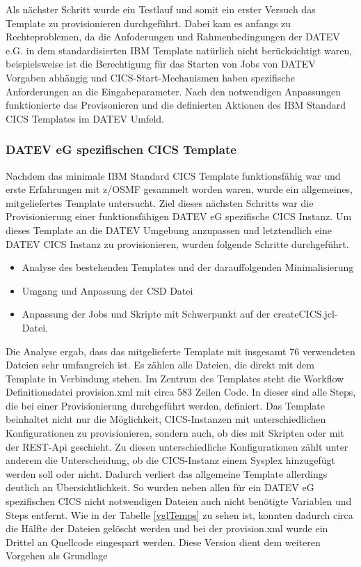 Als nächster Schritt wurde ein Testlauf und somit ein erster Versuch das Template zu provisionieren durchgeführt.
Dabei kam es anfangs zu Rechteproblemen, da die Anfoderungen und Rahmenbedingungen der DATEV e.G. in dem standardisierten IBM Template natürlich nicht berücksichtigt waren, beispielsweise ist die Berechtigung für das Starten von Jobs von DATEV Vorgaben abhängig und CICS-Start-Mechanismen haben spezifische Anforderungen an die Eingabeparameter.
Nach den notwendigen Anpassungen funktionierte das Provisonieren und die definierten Aktionen des IBM Standard CICS Templates im DATEV Umfeld.

\subsubsection{DATEV eG spezifischen CICS Template}\label{sssec:datevcics}
Nachdem das minimale IBM Standard CICS Template funktionsfähig war und erste Erfahrungen mit z/OSMF gesammelt worden waren, wurde ein allgemeines, mitgeliefertes Template untersucht.
Ziel dieses nächsten Schritts war die Provisionierung einer funktionsfähigen DATEV eG spezifische CICS Instanz.
Um dieses Template an die DATEV Umgebung anzupassen und letztendlich eine \glqq DATEV CICS Instanz \grqq{} zu provisionieren, wurden folgende Schritte durchgeführt.

\begin{samepage}
\begin{itemize}
\item Analyse des bestehenden Templates und der darauffolgenden Minimalisierung
\item Umgang und Anpassung der CSD Datei
\item Anpassung der Jobs und Skripte mit Schwerpunkt auf der \glqq createCICS.jcl\grqq-Datei.
\end{itemize}
\end{samepage}

Die Analyse ergab, dass das mitgelieferte Template mit insgesamt 76 verwendeten Dateien sehr umfangreich ist.
Es zählen alle Dateien, die direkt mit dem Template in Verbindung stehen.
Im Zentrum des Templates steht die Workflow Definitionsdatei \glqq provision.xml \grqq{} mit circa 583 Zeilen Code.
In dieser sind alle Steps, die bei einer Provisionierung durchgeführt werden, definiert.
Das Template beinhaltet nicht nur die Möglichkeit, CICS-Instanzen mit unterschiedlichen Konfigurationen zu provisionieren, sondern auch, ob dies mit Skripten oder mit der REST-Api geschieht.
Zu diesen unterschiedliche Konfigurationen zählt unter anderem die Unterscheidung, ob die CICS-Instanz einem Sysplex hinzugefügt werden soll oder nicht.
Dadurch verliert das allgemeine Template allerdings deutlich an Übersichtlichkeit.
So wurden neben allen für ein DATEV eG spezifischen CICS nicht notwendigen Dateien auch nicht benötigte Variablen und Steps entfernt.
Wie in der Tabelle \ref{vglTemps} zu sehen ist, konnten dadurch circa die Hälfte der Dateien gelöscht werden und bei der provision.xml wurde ein Drittel an Quellcode eingespart werden.
Diese Version dient dem weiteren Vorgehen als Grundlage

